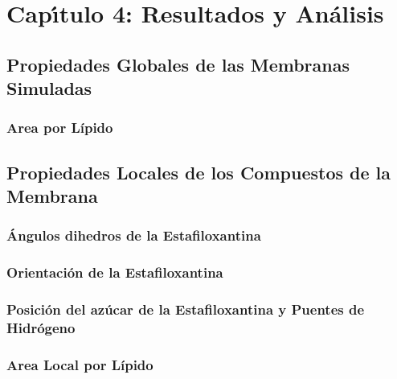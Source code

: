 \chapter{Cap\'{\i}tulo 4: Resultados y An\'{a}lisis}
\section{Propiedades Globales de las Membranas Simuladas}
\subsection{Area por L\'{i}pido}
\section{Propiedades Locales de los Compuestos de la Membrana}
\subsection{\'{A}ngulos dihedros de la Estafiloxantina}
\subsection{Orientaci\'{o}n de la Estafiloxantina}
\subsection{Posici\'{o}n del az\'{u}car  de la Estafiloxantina y Puentes de Hidr\'{o}geno}
\subsection{Area Local por L\'{i}pido}



